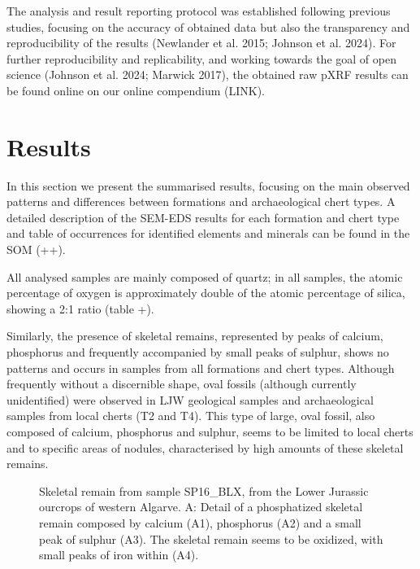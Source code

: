 \documentclass[
  a4paper,
  DIV=11,
  numbers=noendperiod]{scrreprt}
\begin{document}
The analysis and result reporting protocol was established following
previous studies, focusing on the accuracy of obtained data but also the
transparency and reproducibility of the results (Newlander et al. 2015;
Johnson et al. 2024). For further reproducibility and replicability, and
working towards the goal of open science (Johnson et al. 2024; Marwick
2017), the obtained raw pXRF results can be found online on our online
compendium (LINK).

\section{Results}\label{results-2}

In this section we present the summarised results, focusing on the main
observed patterns and differences between formations and archaeological
chert types. A detailed description of the SEM-EDS results for each
formation and chert type and table of occurrences for identified
elements and minerals can be found in the SOM (++).

All analysed samples are mainly composed of quartz; in all samples, the
atomic percentage of oxygen is approximately double of the atomic
percentage of silica, showing a 2:1 ratio (table +).

Similarly, the presence of skeletal remains, represented by peaks of
calcium, phosphorus and frequently accompanied by small peaks of
sulphur, shows no patterns and occurs in samples from all formations and
chert types. Although frequently without a discernible shape, oval
fossils (although currently unidentified) were observed in LJW
geological samples and archaeological samples from local cherts (T2 and
T4). This type of large, oval fossil, also composed of calcium,
phosphorus and sulphur, seems to be limited to local cherts and to
specific areas of nodules, characterised by high amounts of these
skeletal remains.

\begin{figure}


\caption{\label{fig-skeletal}Skeletal remain from sample SP16\_BLX, from
the Lower Jurassic ourcrops of western Algarve. A: Detail of a
phosphatized skeletal remain composed by calcium (A1), phosphorus (A2)
and a small peak of sulphur (A3). The skeletal remain seems to be
oxidized, with small peaks of iron within (A4).}

\end{figure}%
\end{document}
